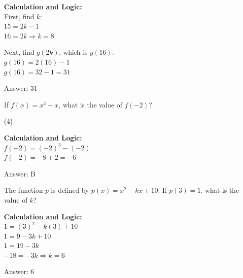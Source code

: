 \documentclass[11pt,paper=a4,answers]{exam}
\begin{document}
\begin{questions}
\begin{solution}
\textbf{Calculation and Logic:} \\
First, find $k$: \\
$15 = 2k - 1$ \\
$16 = 2k \Rightarrow k = 8$

\vspace{10pt}

Next, find $g(2k)$, which is $g(16)$: \\
$g(16) = 2(16) - 1$ \\
$g(16) = 32 - 1 = 31$

\vspace{25pt}

Answer: \colorbox{yellow!100}{31}
\end{solution}

\vspace{40pt}

\question
If $f(x) = x^3 - x$, what is the value of $f(-2)$?
\begin{tasks}(4)
\end{tasks}

\begin{solution}
\textbf{Calculation and Logic:} \\
$f(-2) = (-2)^3 - (-2)$ \\
$f(-2) = -8 + 2 = -6$

\vspace{25pt}

Answer: \colorbox{yellow!100}{B}
\end{solution}

\vspace{40pt}

\question
The function $p$ is defined by $p(x) = x^2 - kx + 10$. If $p(3) = 1$, what is the value of $k$?

\begin{solution}
\textbf{Calculation and Logic:} \\
$1 = (3)^2 - k(3) + 10$ \\
$1 = 9 - 3k + 10$ \\
$1 = 19 - 3k$ \\
$-18 = -3k \Rightarrow k = 6$

\vspace{25pt}

Answer: \colorbox{yellow!100}{6}
\end{solution}


\end{questions}
\end{document}
